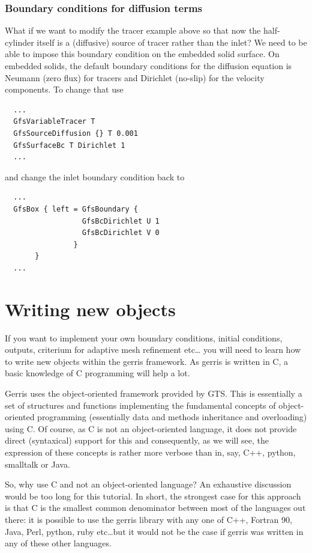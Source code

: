 \documentclass[a4paper]{article}
\begin{document}
\subsubsection{Boundary conditions for diffusion terms}

What if we want to modify the tracer example above so that now the
half-cylinder itself is a (diffusive) source of tracer rather than the
inlet? We need to be able to impose this boundary condition on the
embedded solid surface. On embedded solids, the default boundary
conditions for the diffusion equation is Neumann (zero flux) for
tracers and Dirichlet (no-slip) for the velocity components. To change
that use
\begin{verbatim}
  ...
  GfsVariableTracer T
  GfsSourceDiffusion {} T 0.001
  GfsSurfaceBc T Dirichlet 1
  ...
\end{verbatim}
and change the inlet boundary condition back to
\begin{verbatim}
  ...
  GfsBox { left = GfsBoundary {
                  GfsBcDirichlet U 1
                  GfsBcDirichlet V 0
                } 
       }
  ...
\end{verbatim}

\section{Writing new objects}

If you want to implement your own boundary conditions, initial
conditions, outputs, criterium for adaptive mesh refinement etc\dots
you will need to learn how to write new objects within the gerris
framework. As gerris is written in C, a basic knowledge of C
programming will help a lot.

Gerris uses the object-oriented framework provided by {\sc GTS}. This is
essentially a set of structures and functions implementing the
fundamental concepts of object-oriented programming (essentially data
and methods inheritance and overloading) using C. Of course, as C is
not an object-oriented language, it does not provide direct
(syntaxical) support for this and consequently, as we will see, the
expression of these concepts is rather more verbose than in, say, C++,
python, smalltalk or Java.

So, why use C and not an object-oriented language? An exhaustive
discussion would be too long for this tutorial. In short, the
strongest case for this approach is that C is the smallest common
denominator between most of the languages out there: it is possible to
use the gerris library with any one of C++, Fortran 90, Java, Perl,
python, ruby etc\dots but it would not be the case if gerris was written
in any of these other languages.
\end{document}
